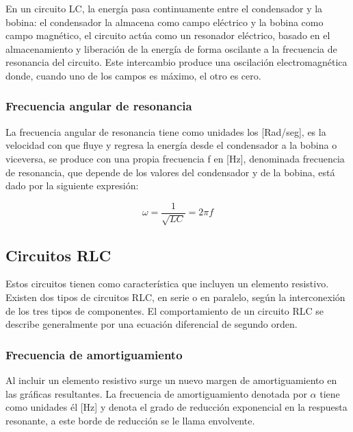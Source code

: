 \documentclass{article}
\begin{document}
    En un circuito LC, la energía pasa continuamente entre el condensador y la bobina: el condensador la almacena como campo eléctrico y la bobina como campo magnético, el circuito actúa como un resonador eléctrico, basado en el almacenamiento y liberación de la energía de forma oscilante a la frecuencia de resonancia del circuito. Este intercambio produce una oscilación electromagnética donde, cuando uno de los campos es máximo, el otro es cero.

    \subsubsection{Frecuencia angular de resonancia}

    La frecuencia angular de resonancia tiene como unidades los [Rad/seg], es la velocidad con que fluye y regresa la energía desde el condensador a la bobina o viceversa, se produce con una propia frecuencia f en [Hz], denominada frecuencia de resonancia, que depende de los valores del condensador y de la bobina, está dado por la siguiente expresión:

    \[
        \omega = \frac{1}{\sqrt{LC}} = 2\pi f
    \]

    \subsection{Circuitos RLC}

    Estos circuitos tienen como característica que incluyen un elemento resistivo. Existen dos tipos de circuitos RLC, en serie o en paralelo, según la interconexión de los tres tipos de componentes. El comportamiento de un circuito RLC se describe generalmente por una ecuación diferencial de segundo orden.

    \subsubsection{Frecuencia de amortiguamiento}


    Al incluir un elemento resistivo surge un nuevo margen de amortiguamiento en las gráficas resultantes. La frecuencia de amortiguamiento denotada por $\alpha$ tiene como unidades él [\unit{\hertz}] y denota el grado de reducción exponencial en la respuesta resonante, a este borde de reducción se le llama envolvente.
\end{document}
